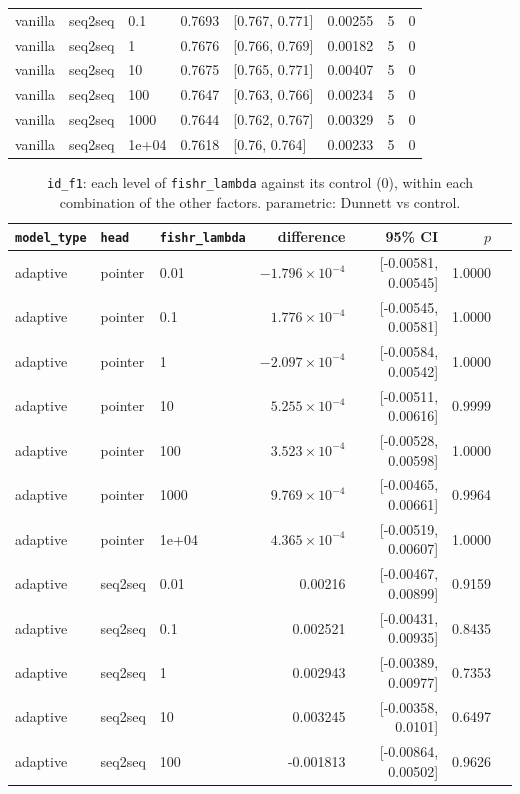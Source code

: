 \documentclass[10pt]{article}
\begin{document}
{\begin{longtable}{lllrlrrr}
vanilla & seq2seq & 0.1 & 0.7693 & [0.767, 0.771] & 0.00255 & 5 & 0\\
vanilla & seq2seq & 1 & 0.7676 & [0.766, 0.769] & 0.00182 & 5 & 0\\
vanilla & seq2seq & 10 & 0.7675 & [0.765, 0.771] & 0.00407 & 5 & 0\\
vanilla & seq2seq & 100 & 0.7647 & [0.763, 0.766] & 0.00234 & 5 & 0\\
vanilla & seq2seq & 1000 & 0.7644 & [0.762, 0.767] & 0.00329 & 5 & 0\\
vanilla & seq2seq & 1e+04 & 0.7618 & [0.76, 0.764] & 0.00233 & 5 & 0\\
\bottomrule
\end{longtable}
}

{\small
\begin{longtable}{lllrrrl}
\caption{\texttt{id\_f1}: each level of \texttt{fishr\_lambda} against its control (0), within each combination of the other factors. parametric: Dunnett vs control.}\label{tab:control-id_f1}\\
\toprule
\texttt{model\_type} & \texttt{head} & \texttt{fishr\_lambda} & difference & 95\% CI & $p$ & \\
\midrule
\endhead
adaptive & pointer & 0.01 & $-1.796\times10^{-4}$ & [-0.00581, 0.00545] & 1.0000 & \\
adaptive & pointer & 0.1 & $1.776\times10^{-4}$ & [-0.00545, 0.00581] & 1.0000 & \\
adaptive & pointer & 1 & $-2.097\times10^{-4}$ & [-0.00584, 0.00542] & 1.0000 & \\
adaptive & pointer & 10 & $5.255\times10^{-4}$ & [-0.00511, 0.00616] & 0.9999 & \\
adaptive & pointer & 100 & $3.523\times10^{-4}$ & [-0.00528, 0.00598] & 1.0000 & \\
adaptive & pointer & 1000 & $9.769\times10^{-4}$ & [-0.00465, 0.00661] & 0.9964 & \\
adaptive & pointer & 1e+04 & $4.365\times10^{-4}$ & [-0.00519, 0.00607] & 1.0000 & \\
adaptive & seq2seq & 0.01 & 0.00216 & [-0.00467, 0.00899] & 0.9159 & \\
adaptive & seq2seq & 0.1 & 0.002521 & [-0.00431, 0.00935] & 0.8435 & \\
adaptive & seq2seq & 1 & 0.002943 & [-0.00389, 0.00977] & 0.7353 & \\
adaptive & seq2seq & 10 & 0.003245 & [-0.00358, 0.0101] & 0.6497 & \\
adaptive & seq2seq & 100 & -0.001813 & [-0.00864, 0.00502] & 0.9626 & \\

\end{longtable}}
\end{document}
